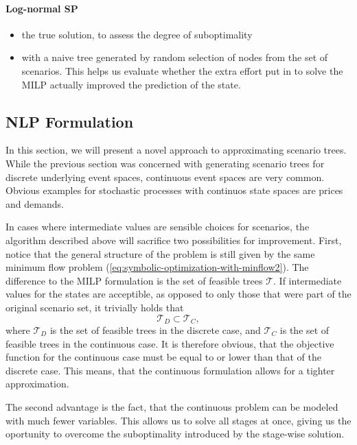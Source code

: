 \documentclass[a4paper, 12pt] {article}
\begin{document}
\paragraph{Log-normal SP}
\begin{itemize}
\item the true solution, to assess the degree of suboptimality
\item with a naive tree generated by random selection of nodes from the set of scenarios. This helps us evaluate whether the extra effort put in to solve the MILP actually improved the prediction of the state.
\end{itemize}
\subsection{NLP Formulation}
In this section, we will present a novel approach to approximating scenario trees. While the previous section was concerned with generating scenario trees for discrete underlying event spaces, continuous event spaces are very common. Obvious examples for stochastic processes with continuos state spaces are prices and demands.

In cases where intermediate values are sensible choices for scenarios, the algorithm described above will sacrifice two possibilities for improvement. First, notice that the general structure of the problem is still given by the same minimum flow problem (\ref{eq:symbolic-optimization-with-minflow2}). The difference to the MILP formulation is the set of feasible trees $\mathcal{T}$. If intermediate values for the states are acceptible, as opposed to only those that were part of the original scenario set, it trivially holds that
\begin{equation}
  \label{eq:T-D-subset-T-C}
  \mathcal{T}_D\subset \mathcal{T}_C,
\end{equation}
where $\mathcal{T}_D$ is the set of feasible trees in the discrete case, and $\mathcal{T}_C$ is the set of feasible trees in the continuous case. It is therefore obvious, that the objective function for the continuous case must be equal to or lower than that of the discrete case. This means, that the continuous formulation allows for a tighter approximation.

The second advantage is the fact, that the continuous problem can be modeled with much fewer variables. This allows us to solve all stages at once, giving us the oportunity to overcome the suboptimality introduced by the stage-wise solution.
\end{document}
